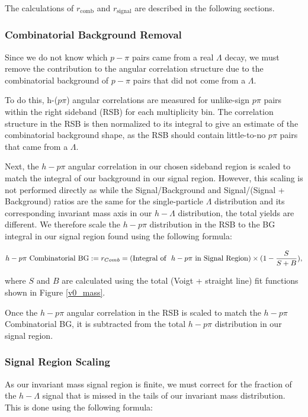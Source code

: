\documentclass[ALICE,manyauthors]{ALICE_analysis_notes}
\begin{document}
The calculations of $r_{\text{comb}}$ and $r_{\text{signal}}$ are described in the following sections.

\subsubsection{Combinatorial Background Removal}
\label{removecomb_v0}
Since we do not know which $p-\pi$ pairs came from a real $\Lambda$ decay, we must remove the contribution to the angular correlation structure due to the combinatorial background of $p-\pi$ pairs that did not come from a $\Lambda$.

To do this, h-($p\pi$) angular correlations are measured for unlike-sign $p\pi$ pairs within the right sideband (RSB) for each multiplicity bin. The correlation structure in the RSB is then normalized to its integral to give an estimate of the combinatorial background shape, as the RSB should contain little-to-no $p\pi$ pairs that came from a $\Lambda$. 

Next, the $h-p\pi$ angular correlation in our chosen sideband region is scaled to match the integral of our background in our signal region. However, this scaling is not performed directly as while the Signal/Background and Signal/(Signal + Background) ratios are the same for the single-particle $\Lambda$ distribution and its corresponding invariant mass axis in our $h-\Lambda$ distribution, the total yields are different. We therefore scale the $h-p\pi$ distribution in the RSB to the BG integral in our signal region found using the following formula:

\begin{align}
	h-p\pi \text{\space Combinatorial BG} := r_{Comb} = (\text{Integral of \space} h-p\pi \text{\space in Signal Region}) \times (1 - \frac{S}{S+B}),
\end{align}

where $S$ and $B$ are calculated using the total (Voigt + straight line) fit functions shown in Figure \ref{v0_mass}.

Once the $h-p\pi$ angular correlation in the RSB is scaled to match the $h-p\pi$ Combinatorial BG, it is subtracted from the total $h-p\pi$ distribution in our signal region. 

\subsubsection{Signal Region Scaling}
As our invariant mass signal region is finite, we must correct for the fraction of the $h-\Lambda$ signal that is missed in the tails of our invariant mass distribution. This is done using the following formula:
\end{document}
